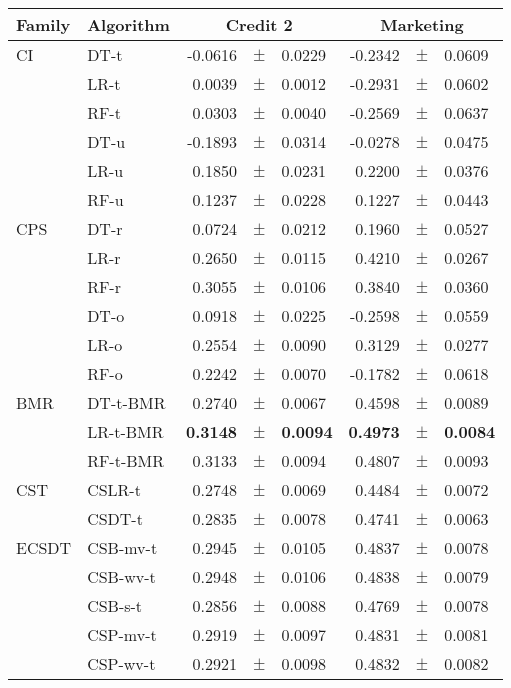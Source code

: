 \begin{table}[!t]
    \centering
    \footnotesize
    \begin{tabular}{l l r@{\hskip 0in}c@{\hskip 0in}l r@{\hskip 0in}c@{\hskip 0in}l  } %
    \hline
    \bf{Family} & \bf{Algorithm} &  \multicolumn{3}{c}{\bf{Credit 2}} 
& \multicolumn{3}{c}{\bf{Marketing}} \\ 
    \hline
CI&DT-t & -0.0616 &$\pm$& 0.0229 & -0.2342 &$\pm$& 0.0609\\ 
&LR-t & 0.0039 &$\pm$& 0.0012 & -0.2931 &$\pm$& 0.0602\\ 
&RF-t & 0.0303 &$\pm$& 0.0040 & -0.2569 &$\pm$& 0.0637\\ 
&DT-u & -0.1893 &$\pm$& 0.0314 & -0.0278 &$\pm$& 0.0475\\ 
&LR-u &  0.1850 &$\pm$& 0.0231 & 0.2200 &$\pm$& 0.0376\\ 
&RF-u & 0.1237 &$\pm$& 0.0228 & 0.1227 &$\pm$& 0.0443\\ 
\hline 
CPS&DT-r & 0.0724 &$\pm$&0.0212 & 0.1960 &$\pm$& 0.0527\\ 
&LR-r &  0.2650 &$\pm$& 0.0115 & 0.4210 &$\pm$& 0.0267\\ 
&RF-r & 0.3055 &$\pm$& 0.0106 & 0.3840 &$\pm$& 0.0360\\ 
&DT-o &  0.0918 &$\pm$&0.0225 & -0.2598 &$\pm$& 0.0559\\ 
&LR-o &  0.2554 &$\pm$&0.0090 & 0.3129 &$\pm$& 0.0277\\ 
&RF-o &  0.2242 &$\pm$&0.0070 & -0.1782 &$\pm$& 0.0618\\ 
\hline 
BMR&DT-t-BMR & 0.2740 &$\pm$& 0.0067 & 0.4598 &$\pm$& 0.0089\\ 
&LR-t-BMR & \bf{0.3148} &\bf{$\pm$}& \bf{0.0094} & \bf{0.4973} &\bf{$\pm$}& \bf{0.0084}\\ 
&RF-t-BMR & 0.3133 &$\pm$& 0.0094 & 0.4807 &$\pm$& 0.0093\\ 
\hline 
CST&CSLR-t & 0.2748 &$\pm$&0.0069 & 0.4484 &$\pm$& 0.0072\\ 
&CSDT-t &  0.2835 &$\pm$& 0.0078 & 0.4741 &$\pm$& 0.0063\\ 
\hline 
ECSDT&CSB-mv-t &  0.2945 &$\pm$& 0.0105 & 0.4837 &$\pm$& 0.0078\\ 
&CSB-wv-t & 0.2948 &$\pm$&0.0106 & 0.4838 &$\pm$& 0.0079\\ 
&CSB-s-t &  0.2856 &$\pm$& 0.0088 & 0.4769 &$\pm$& 0.0078\\ 
&CSP-mv-t & 0.2919 &$\pm$& 0.0097 & 0.4831 &$\pm$& 0.0081\\ 
&CSP-wv-t & 0.2921 &$\pm$& 0.0098 & 0.4832 &$\pm$& 0.0082\\ 

\end{tabular}
\end{table}
